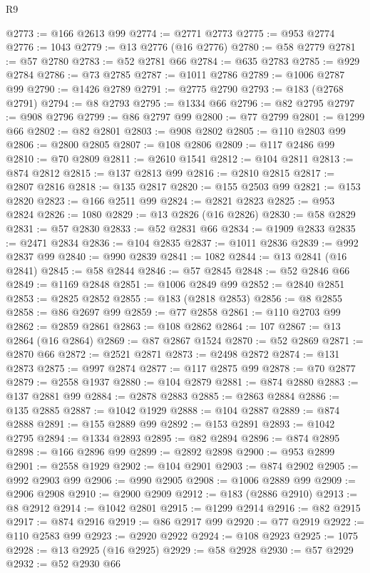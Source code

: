 \begin{lexlean}{R9}
\begin{coremodule}
@2773 := @166 @2613 @99
@2774 := @2771 @2773
@2775 := @953 @2774
@2776 := 1043
@2779 := @13 @2776 (@16 @2776)
@2780 := @58 @2779
@2781 := @57 @2780
@2783 := @52 @2781 @66
@2784 := @635 @2783
@2785 := @929 @2784
@2786 := @73 @2785
@2787 := @1011 @2786
@2789 := @1006 @2787 @99
@2790 := @1426 @2789
@2791 := @2775 @2790
@2793 := @183 (@2768 @2791)
@2794 := @8 @2793
@2795 := @1334 @66
@2796 := @82 @2795
@2797 := @908 @2796
@2799 := @86 @2797 @99
@2800 := @77 @2799
@2801 := @1299 @66
@2802 := @82 @2801
@2803 := @908 @2802
@2805 := @110 @2803 @99
@2806 := @2800 @2805
@2807 := @108 @2806
@2809 := @117 @2486 @99
@2810 := @70 @2809
@2811 := @2610 @1541
@2812 := @104 @2811
@2813 := @874 @2812
@2815 := @137 @2813 @99
@2816 := @2810 @2815
@2817 := @2807 @2816
@2818 := @135 @2817
@2820 := @155 @2503 @99
@2821 := @153 @2820
@2823 := @166 @2511 @99
@2824 := @2821 @2823
@2825 := @953 @2824
@2826 := 1080
@2829 := @13 @2826 (@16 @2826)
@2830 := @58 @2829
@2831 := @57 @2830
@2833 := @52 @2831 @66
@2834 := @1909 @2833
@2835 := @2471 @2834
@2836 := @104 @2835
@2837 := @1011 @2836
@2839 := @992 @2837 @99
@2840 := @990 @2839
@2841 := 1082
@2844 := @13 @2841 (@16 @2841)
@2845 := @58 @2844
@2846 := @57 @2845
@2848 := @52 @2846 @66
@2849 := @1169 @2848
@2851 := @1006 @2849 @99
@2852 := @2840 @2851
@2853 := @2825 @2852
@2855 := @183 (@2818 @2853)
@2856 := @8 @2855
@2858 := @86 @2697 @99
@2859 := @77 @2858
@2861 := @110 @2703 @99
@2862 := @2859 @2861
@2863 := @108 @2862
@2864 := 107
@2867 := @13 @2864 (@16 @2864)
@2869 := @87 @2867 @1524
@2870 := @52 @2869
@2871 := @2870 @66
@2872 := @2521 @2871
@2873 := @2498 @2872
@2874 := @131 @2873
@2875 := @997 @2874
@2877 := @117 @2875 @99
@2878 := @70 @2877
@2879 := @2558 @1937
@2880 := @104 @2879
@2881 := @874 @2880
@2883 := @137 @2881 @99
@2884 := @2878 @2883
@2885 := @2863 @2884
@2886 := @135 @2885
@2887 := @1042 @1929
@2888 := @104 @2887
@2889 := @874 @2888
@2891 := @155 @2889 @99
@2892 := @153 @2891
@2893 := @1042 @2795
@2894 := @1334 @2893
@2895 := @82 @2894
@2896 := @874 @2895
@2898 := @166 @2896 @99
@2899 := @2892 @2898
@2900 := @953 @2899
@2901 := @2558 @1929
@2902 := @104 @2901
@2903 := @874 @2902
@2905 := @992 @2903 @99
@2906 := @990 @2905
@2908 := @1006 @2889 @99
@2909 := @2906 @2908
@2910 := @2900 @2909
@2912 := @183 (@2886 @2910)
@2913 := @8 @2912
@2914 := @1042 @2801
@2915 := @1299 @2914
@2916 := @82 @2915
@2917 := @874 @2916
@2919 := @86 @2917 @99
@2920 := @77 @2919
@2922 := @110 @2583 @99
@2923 := @2920 @2922
@2924 := @108 @2923
@2925 := 1075
@2928 := @13 @2925 (@16 @2925)
@2929 := @58 @2928
@2930 := @57 @2929
@2932 := @52 @2930 @66

\end{coremodule}
\end{lexlean}
